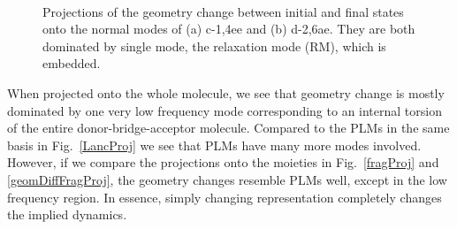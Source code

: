 \begin{figure}[!h]
\\
\caption{Projections of the geometry change between initial and final states onto the normal modes of (a) c-1,4ee and (b) d-2,6ae. They are both dominated by single mode, the relaxation mode (RM), which is embedded.\label{geomDiffProj}}
\end{figure}



When projected onto the whole molecule, we see that geometry change is mostly dominated
by one  very low frequency mode  corresponding to an internal  torsion of the entire donor-bridge-acceptor molecule.
Compared to the PLMs in the same basis in Fig.~\ref{LancProj}
 we see that  PLMs  have many more modes involved.
However, if we compare the projections onto the  moieties in  Fig.~\ref{fragProj}
and \ref{geomDiffFragProj}, the geometry changes resemble PLMs well, except in the low frequency region.
In essence, simply changing representation completely changes the implied dynamics.


